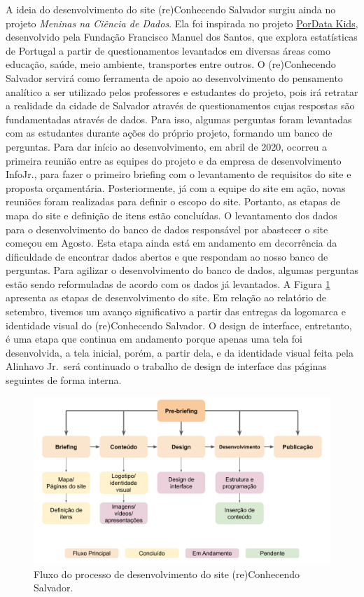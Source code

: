 \documentclass[
]{book}
\begin{document}
A ideia do desenvolvimento do site (re)Conhecendo Salvador surgiu ainda no projeto \emph{Meninas na Ciência de Dados}. Ela foi inspirada no projeto \href{https://www.pordatakids.pt/Inicio}{PorData Kids}, desenvolvido pela Fundação Francisco Manuel dos Santos, que explora estatísticas de Portugal a partir de questionamentos levantados em diversas áreas como educação, saúde, meio ambiente, transportes entre outros.
O (re)Conhecendo Salvador servirá como ferramenta de apoio ao desenvolvimento do pensamento analítico a ser utilizado pelos professores e estudantes do projeto, pois irá retratar a realidade da cidade de Salvador através de questionamentos cujas respostas são fundamentadas através de dados. Para isso, algumas perguntas foram levantadas com as estudantes durante ações do próprio projeto, formando um banco de perguntas.
Para dar início ao desenvolvimento, em abril de 2020, ocorreu a primeira reunião entre as equipes do projeto e da empresa de desenvolvimento InfoJr., para fazer o primeiro briefing com o levantamento de requisitos do site e proposta orçamentária. Posteriormente, já com a equipe do site em ação, novas reuniões foram realizadas para definir o escopo do site. Portanto, as etapas de mapa do site e definição de itens estão concluídas.
O levantamento dos dados para o desenvolvimento do banco de dados responsável por abastecer o site começou em Agosto. Esta etapa ainda está em andamento em decorrência da dificuldade de encontrar dados abertos e que respondam ao nosso banco de perguntas. Para agilizar o desenvolvimento do banco de dados, algumas perguntas estão sendo reformuladas de acordo com os dados já levantados.
A Figura \ref{fig:steprecossa} apresenta as etapas de desenvolvimento do site. Em relação ao relatório de setembro, tivemos um avanço significativo a partir das entregas da logomarca e identidade visual do (re)Conhecendo Salvador. O design de interface, entretanto, é uma etapa que continua em andamento porque apenas uma tela foi desenvolvida, a tela inicial, porém, a partir dela, e da identidade visual feita pela Alinhavo Jr.~será continuado o trabalho de design de interface das páginas seguintes de forma interna.

\begin{figure}
\includegraphics[width=17.78in]{images/image108} \caption{Fluxo do processo de desenvolvimento do site (re)Conhecendo Salvador.}\label{fig:steprecossa}
\end{figure}
\end{document}
